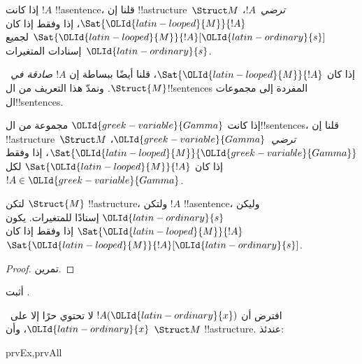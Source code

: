 \documentclass[../../../include/open-logic-section]{subfiles}
\begin{document}
\begin{defn}
إذا كانت $!A$ !!a{sentence}، قلنا إن !!a{structure}~$\Struct M$
\emph{ترضي}~$!A$، $\Sat{\OLId{latin-looped}{M}}{!A}$، إذا وفقط إذا كان
$\Sat{\OLId{latin-looped}{M}}{!A}[\OLId{latin-ordinary}{s}]$ لجميع إسنادات المتغيرات~$\OLId{latin-ordinary}{s}$.
\end{defn}

إذا كان $\Sat{\OLId{latin-looped}{M}}{!A}$، قلنا أيضًا ببساطة إن
\emph{$!A$ صادقة في~$\Struct{M}$.} ونمدّ هذا التعريف
من ال!!{sentence}s المفردة إلى مجموعات ال!!{sentence}s.

\begin{defn}
إذا كانت $\OLId{greek-variable}{Gamma}$ مجموعة من ال!!{sentence}s، قلنا إن
!!a{structure}~$\Struct M$ \emph{ترضي}~$\OLId{greek-variable}{Gamma}$،
$\Sat{\OLId{latin-looped}{M}}{\OLId{greek-variable}{Gamma}}$، إذا وفقط إذا كان $\Sat{\OLId{latin-looped}{M}}{!A}$ لكل
$!A \in \OLId{greek-variable}{Gamma}$.
\end{defn}

\begin{prop}
  لتكن $\Struct{M}$ !!a{structure}، ولتكن $!A$ !!a{sentence}، وليكن
  $\OLId{latin-ordinary}{s}$ إسنادًا للمتغيرات. يكون $\Sat{\OLId{latin-looped}{M}}{!A}$ إذا وفقط إذا كان
  $\Sat{\OLId{latin-looped}{M}}{!A}[\OLId{latin-ordinary}{s}]$.
\end{prop}

\begin{proof}
تمرين.
\end{proof}

\begin{prob}
أثبت .
\end{prob}

\begin{prop}
  افترض أن $!A(\OLId{latin-ordinary}{x})$ لا تحتوي حرًا إلا على~$\OLId{latin-ordinary}{x}$، وأن $\Struct M$
  !!a{structure}. عندئذ:
  \begin{tagenumerate}{prvEx,prvAll}
\end{tagenumerate}
\end{prop}
\end{document}
